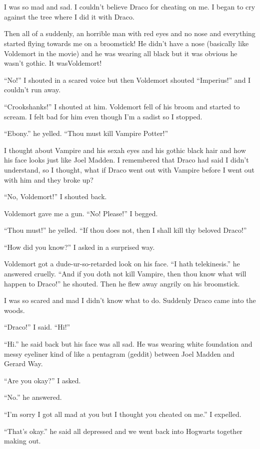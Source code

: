 \section{}



I was so mad and sad. I couldn't believe Draco for cheating on me. I began to cry against the tree where I did it with Draco.

Then all of a suddenly, an horrible man with red eyes and no nose and everything started flying towards me on a broomstick! He didn't have a nose (basically like Voldemort in the movie) and he was wearing all black but it was obvious he wasn't gothic. It was\dotfill Voldemort!

\enquote{No!} I shouted in a scared voice but then Voldemort shouted \enquote{Imperius!} and I couldn't run away.

\enquote{Crookshanks!} I shouted at him. Voldemort fell of his broom and started to scream. I felt bad for him even though I'm a sadist so I stopped.

\enquote{Ebony.} he yelled. \enquote{Thou must kill Vampire Potter!}

I thought about Vampire and his sexah eyes and his gothic black hair and how his face looks just like Joel Madden. I remembered that Draco had said I didn't understand, so I thought, what if Draco went out with Vampire before I went out with him and they broke up?

\enquote{No, Voldemort!} I shouted back.

Voldemort gave me a gun. \enquote{No! Please!} I begged.

\enquote{Thou must!} he yelled. \enquote{If thou does not, then I shall kill thy beloved Draco!}

\enquote{How did you know?} I asked in a surprised way.

Voldemort got a dude-ur-so-retarded look on his face. \enquote{I hath telekinesis.} he answered cruelly. \enquote{And if you doth not kill Vampire, then thou know what will happen to Draco!} he shouted. Then he flew away angrily on his broomstick.

I was so scared and mad I didn't know what to do. Suddenly Draco came into the woods.

\enquote{Draco!} I said. \enquote{Hi!}

\enquote{Hi.} he said back but his face was all sad. He was wearing white foundation and messy eyeliner kind of like a pentagram (geddit) between Joel Madden and Gerard Way.

\enquote{Are you okay?} I asked.

\enquote{No.} he answered.

\enquote{I'm sorry I got all mad at you but I thought you cheated on me.} I expelled.

\enquote{That's okay.} he said all depressed and we went back into Hogwarts together making out.
